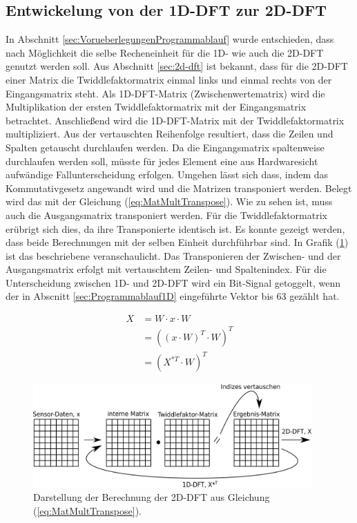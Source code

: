 \subsection{Entwickelung von der 1D-DFT zur 2D-DFT}
In Abschnitt \ref{sec:VorueberlegungenProgrammablauf} wurde entschieden, dass nach Möglichkeit die selbe Recheneinheit
für die 1D- wie auch die 2D-DFT genutzt werden soll. 
Aus Abschnitt \ref{sec:2d-dft} ist bekannt, dass für die 2D-DFT einer Matrix die Twiddlefaktormatrix einmal links und einmal rechts von der Eingangsmatrix steht.
Als 1D-DFT-Matrix (Zwischenwertematrix) wird die Multiplikation der ersten Twiddlefaktormatrix mit der Eingangsmatrix betrachtet. Anschließend wird die 1D-DFT-Matrix mit der 
Twiddlefaktormatrix multipliziert. Aus der vertauschten Reihenfolge resultiert, dass die Zeilen und Spalten getauscht durchlaufen werden. 
Da die Eingangsmatrix spaltenweise durchlaufen werden soll, müsste  für jedes Element eine aus Hardwaresicht aufwändige Fallunterscheidung erfolgen.
Umgehen lässt sich dass, indem das Kommutativgesetz angewandt wird und die Matrizen transponiert werden. Belegt wird das mit der Gleichung (\ref{eq:MatMultTranspose}). Wie zu sehen ist, muss auch die Ausgangsmatrix transponiert werden. Für die Twiddlefaktormatrix erübrigt sich dies, da ihre Transponierte identisch ist.
Es konnte gezeigt werden, dass beide Berechnungen mit der selben Einheit durchführbar sind. In Grafik (\ref{pic:MatMultTranspose}) ist das beschriebene veranschaulicht.
Das Transponieren der Zwischen- und der Ausgangsmatrix erfolgt mit vertauschtem Zeilen- und Spaltenindex. 
Für die Unterscheidung zwischen 1D- und 2D-DFT wird ein Bit-Signal getoggelt, wenn der in Abscnitt \ref{sec:Programmablauf1D} eingeführte Vektor bis 63 gezählt hat.

\begin{align}
 X &= W \cdot x \cdot W \nonumber \\
   &= \left(\left(x\cdot W\right)^T\cdot W\right)^T \label{eq:MatMultTranspose}\\
   &= \left(X^{*T} \cdot W\right)^T \nonumber
\end{align}


\begin{figure}[htbp]
 \centering
 \includegraphics[width=0.95\textwidth]{img/MatMultTranspose2.png}
 \caption{Darstellung der Berechnung der 2D-DFT aus Gleichung (\ref{eq:MatMultTranspose}).}
 \label{pic:MatMultTranspose}
\end{figure}




